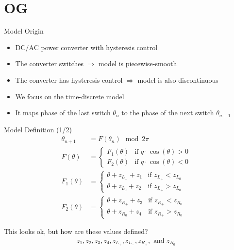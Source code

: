 \section{OG}

\begin{frame}{Model Origin}
	\begin{itemize}
		\item DC/AC power converter with hysteresis control
		\item The converter switches $\Rightarrow$ model is piecewise-smooth
		\item The converter has hysteresis control $\Rightarrow$ model is also discontinuous
		      \pause \vspace{1em}
		\item We focus on the time-discrete model
		\item It maps phase of the last switch $\theta_n$ to the phase of the next switch $\theta_{n+1}$
	\end{itemize}
\end{frame}

\begin{frame}{Model Definition (1/2)}
	\vspace{-2.0em}
	\begin{align}
		\theta_{n+1} & =  F(\theta_n) \mod 2 \pi
		\\
		F(\theta)    & = \begin{cases}
			                 F_1(\theta) & \text{if } q \cdot \cos(\theta) > 0 \\
			                 F_2(\theta) & \text{if } q \cdot \cos(\theta) < 0
		                 \end{cases}
		\\
		F_1(\theta)  & = \begin{cases}
			                 \theta + z_{L_+} + z_1 & \text{if } z_{L_+} < z_{L_0} \\
			                 \theta + z_{L_0} + z_2 & \text{if } z_{L_+} > z_{L_0}
		                 \end{cases}
		\\
		F_2(\theta)  & = \begin{cases}
			                 \theta + z_{R_+} + z_3 & \text{if } z_{R_+} < z_{R_0} \\
			                 \theta + z_{R_0} + z_4 & \text{if } z_{R_+} > z_{R_0}
		                 \end{cases}
	\end{align}

	\pause
	\vspace{2em}
	This looks ok, but how are these values defined?
	\begin{align*}
		z_1, z_2, z_3, z_4, z_{L_+}, z_{L_-}, z_{R_+}, \text{ and } z_{R_0}
	\end{align*}
\end{frame}

